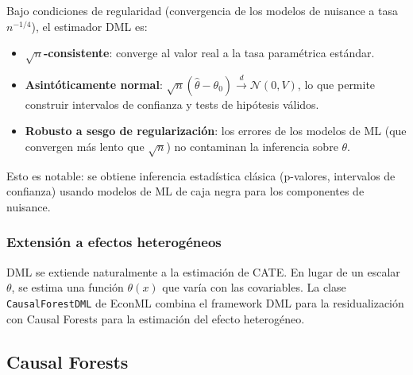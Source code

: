 \documentclass[
  spanish,
  11pt,
  letterpaper,
]{scrbook}
\providecommand{\tightlist}{%
  \setlength{\itemsep}{0pt}\setlength{\parskip}{0pt}}
\theoremstyle{plain}
\theoremstyle{remark}
\begin{document}
\begin{tcolorbox}[enhanced jigsaw, arc=.35mm, bottomrule=.15mm, bottomtitle=1mm, breakable, colback=white, colbacktitle=quarto-callout-note-color!10!white, colframe=quarto-callout-note-color-frame, coltitle=black, left=2mm, leftrule=.75mm, opacityback=0, opacitybacktitle=0.6, rightrule=.15mm, title=\textcolor{quarto-callout-note-color}{\faInfo}\hspace{0.5em}{Propiedades teóricas de DML}, titlerule=0mm, toprule=.15mm, toptitle=1mm]

Bajo condiciones de regularidad (convergencia de los modelos de nuisance
a tasa \(n^{-1/4}\)), el estimador DML es:

\begin{itemize}
\tightlist
\item
  \textbf{\(\sqrt{n}\)-consistente}: converge al valor real a la tasa
  paramétrica estándar.
\item
  \textbf{Asintóticamente normal}:
  \(\sqrt{n}(\hat{\theta} - \theta_0) \xrightarrow{d} \mathcal{N}(0, V)\),
  lo que permite construir intervalos de confianza y tests de hipótesis
  válidos.
\item
  \textbf{Robusto a sesgo de regularización}: los errores de los modelos
  de ML (que convergen más lento que \(\sqrt{n}\)) no contaminan la
  inferencia sobre \(\theta\).
\end{itemize}

Esto es notable: se obtiene inferencia estadística clásica (p-valores,
intervalos de confianza) usando modelos de ML de caja negra para los
componentes de nuisance.

\end{tcolorbox}

\subsubsection{Extensión a efectos
heterogéneos}\label{extensiuxf3n-a-efectos-heteroguxe9neos}

DML se extiende naturalmente a la estimación de CATE. En lugar de un
escalar \(\theta\), se estima una función \(\theta(x)\) que varía con
las covariables. La clase \texttt{CausalForestDML} de EconML combina el
framework DML para la residualización con Causal Forests para la
estimación del efecto heterogéneo.

\subsection{Causal Forests}\label{sec-causal-forests}
\end{document}
